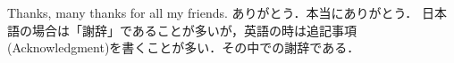 
Thanks, many thanks for all my friends. ありがとう．本当にありがとう．
日本語の場合は「謝辞」であることが多いが，英語の時は追記事項(Acknowledgment)を書くことが多い．その中での謝辞である．
